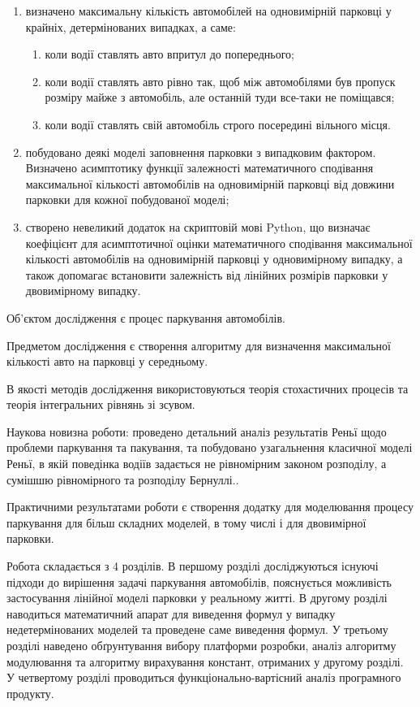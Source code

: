 \begin{enumerate}
	\item визначено максимальну кількість автомобілей на одновимірній парковці у крайніх, 			детермінованих випадках, а саме:
	\begin{enumerate}
		\item коли водії ставлять авто впритул до попереднього;
		\item коли водії ставлять авто рівно так, щоб між автомобілями був пропуск розміру 			майже з автомобіль, але останній туди все-таки не поміщався;
		\item коли водії ставлять свій автомобіль строго посередині вільного місця.
	\end{enumerate}
        	\item побудовано деякі моделі заповнення парковки з випадковим фактором. Визначено 		асимптотику функції залежності математичного сподівання максимальної кількості 		автомобілів на одновимірній парковці від довжини парковки для кожної побудованої моделі;
	\item створено невеликий додаток на скриптовій мові Python, що визначає коефіцієнт для 		асимптотичної оцінки математичного сподівання максимальної кількості автомобілів на 		одновимірній парковці у одновимірному випадку, а також допомагає встановити 			залежність від лінійних розмірів парковки у двовимірному випадку.
\end{enumerate}

Об'єктом дослідження є процес паркування автомобілів.

Предметом дослідження є створення алгоритму для визначення максимальної кількості авто на парковці у середньому.

В якості методів дослідження використовуються теорія стохастичних процесів та теорія інтегральних рівнянь зі зсувом.

Наукова новизна роботи: проведено детальний аналіз результатів Реньї щодо проблеми паркування та пакування, та побудовано узагальнення класичної моделі Реньї, в якій поведінка водіїв задається не рівномірним законом розподілу, а сумішшю рівномірного та розподілу Бернуллі..

Практичними результатами роботи є створення додатку для моделювання процесу паркування для більш складних моделей, в тому числі і для двовимірної парковки.

Робота складається з 4 розділів. В першому розділі досліджуються існуючі підходи до вирішення задачі паркування автомобілів, пояснується можливість застосування лінійної моделі парковки у реальному житті. В другому розділі наводиться математичний апарат для виведення формул у випадку недетермінованих моделей та проведене саме виведення формул. У третьому розділі наведено обґрунтування вибору платформи розробки, аналіз алгоритму модулювання та алгоритму вирахування констант, отриманих у другому розділі. У четвертому розділі проводиться функціонально-вартісний аналіз програмного продукту.